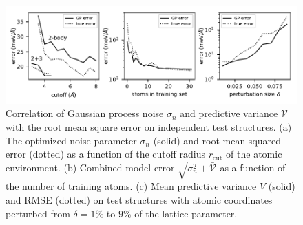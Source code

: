 \documentclass[%
reprint,
superscriptaddress,
amsmath,amssymb,
aps,
prl,
]{revtex4-1}
\begin{document}
\begin{figure}
	\centering
	\includegraphics[width=7in]{calibrate.pdf}
	\caption{Correlation of Gaussian process noise $\sigma_n$ and predictive variance $\mathcal{V}$ with the root mean square error on independent test structures. (a) The optimized noise parameter $\sigma_n$ (solid) and root mean squared error (dotted) as a function of the cutoff radius $r_{\text{cut}}$ of the atomic environment. (b) Combined model error $\sqrt{\sigma_n^2 + \bar{\mathcal{V}}}$ as a function of the number of training atoms. (c) Mean predictive variance $\bar{V}$ (solid) and RMSE (dotted) on test structures with atomic coordinates perturbed from $\delta = 1\%$ to $9\%$ of the lattice parameter.}
\end{figure}
\end{document}
